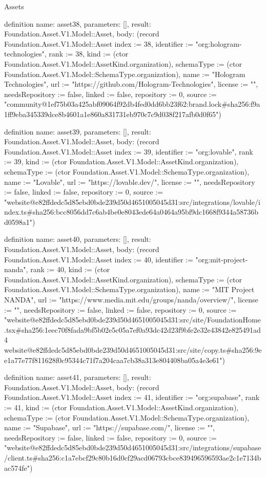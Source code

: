 \begin{lexlean}{Assets}
\begin{semanticmodule}
definition{
  name: asset38,
  parameters: [],
  result: Foundation.Asset.V1.Model::Asset,
  body: (record Foundation.Asset.V1.Model::Asset {index := 38, identifier := "org:hologram-technologies", rank := 38, kind := (ctor Foundation.Asset.V1.Model::AssetKind.organization), schemaType := (ctor Foundation.Asset.V1.Model::SchemaType.organization), name := "Hologram Technologies", url := "https://github.com/Hologram-Technologies", license := "", needsRepository := false, linked := false, repository := 0, source := "community@1ef75b03a425abf09064f92db4fed0dd6bb23f62:brand.lock#sha256:f9a1ff9eba345339dce8b4601a1e860a831731eb970c7c9d038f217afb0d0f65"})
}

definition{
  name: asset39,
  parameters: [],
  result: Foundation.Asset.V1.Model::Asset,
  body: (record Foundation.Asset.V1.Model::Asset {index := 39, identifier := "org:lovable", rank := 39, kind := (ctor Foundation.Asset.V1.Model::AssetKind.organization), schemaType := (ctor Foundation.Asset.V1.Model::SchemaType.organization), name := "Lovable", url := "https://lovable.dev/", license := "", needsRepository := false, linked := false, repository := 0, source := "website@e82ffdedc5d85ebd0bde239d50d4651005045d31:src/integrations/lovable/index.ts#sha256:bcc8056dd7c6ab4be0e8043ede64a0464a95bf9dc1668f9344a58736bd0598a1"})
}

definition{
  name: asset40,
  parameters: [],
  result: Foundation.Asset.V1.Model::Asset,
  body: (record Foundation.Asset.V1.Model::Asset {index := 40, identifier := "org:mit-project-nanda", rank := 40, kind := (ctor Foundation.Asset.V1.Model::AssetKind.organization), schemaType := (ctor Foundation.Asset.V1.Model::SchemaType.organization), name := "MIT Project NANDA", url := "https://www.media.mit.edu/groups/nanda/overview/", license := "", needsRepository := false, linked := false, repository := 0, source := "website@e82ffdedc5d85ebd0bde239d50d4651005045d31:src/site/FoundationHome.tsx#sha256:1eec70f8fada9bf5b02e5c05a7ef0a93dc42d23f9bfe2e32e43842e825491ad4 website@e82ffdedc5d85ebd0bde239d50d4651005045d31:src/site/copy.ts#sha256:9ee1a77e77f811628f0c95344c71f7a204caa7cb38a313e804408ba05a4e3e61"})
}

definition{
  name: asset41,
  parameters: [],
  result: Foundation.Asset.V1.Model::Asset,
  body: (record Foundation.Asset.V1.Model::Asset {index := 41, identifier := "org:supabase", rank := 41, kind := (ctor Foundation.Asset.V1.Model::AssetKind.organization), schemaType := (ctor Foundation.Asset.V1.Model::SchemaType.organization), name := "Supabase", url := "https://supabase.com/", license := "", needsRepository := false, linked := false, repository := 0, source := "website@e82ffdedc5d85ebd0bde239d50d4651005045d31:src/integrations/supabase/client.ts#sha256:c1a7ebcf29c80b16d0cf29acd06793cbce839496596593ae2c1e7134bac574fe"})
}


\end{semanticmodule}
\end{lexlean}
